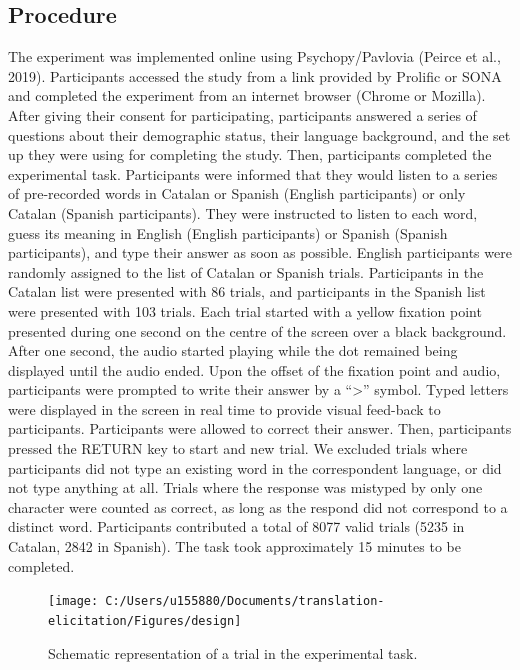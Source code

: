 \documentclass[
  english,
  man,floatsintext]{apa6}
\begin{document}
\hypertarget{procedure}{%
\subsection{Procedure}\label{procedure}}

The experiment was implemented online using Psychopy/Pavlovia (Peirce et al., 2019). Participants accessed the study from a link provided by Prolific or SONA and completed the experiment from an internet browser (Chrome or Mozilla). After giving their consent for participating, participants answered a series of questions about their demographic status, their language background, and the set up they were using for completing the study. Then, participants completed the experimental task. Participants were informed that they would listen to a series of pre-recorded words in Catalan or Spanish (English participants) or only Catalan (Spanish participants). They were instructed to listen to each word, guess its meaning in English (English participants) or Spanish (Spanish participants), and type their answer as soon as possible. English participants were randomly assigned to the list of Catalan or Spanish trials. Participants in the Catalan list were presented with 86 trials, and participants in the Spanish list were presented with 103 trials. Each trial started with a yellow fixation point presented during one second on the centre of the screen over a black background. After one second, the audio started playing while the dot remained being displayed until the audio ended. Upon the offset of the fixation point and audio, participants were prompted to write their answer by a ``\textgreater{}'' symbol. Typed letters were displayed in the screen in real time to provide visual feed-back to participants. Participants were allowed to correct their answer. Then, participants pressed the RETURN key to start and new trial. We excluded trials where participants did not type an existing word in the correspondent language, or did not type anything at all. Trials where the response was mistyped by only one character were counted as correct, as long as the respond did not correspond to a distinct word. Participants contributed a total of 8077 valid trials (5235 in Catalan, 2842 in Spanish). The task took approximately 15 minutes to be completed.

\begin{figure}
\texttt{[image: C:/Users/u155880/Documents/translation-elicitation/Figures/design]} \caption{Schematic representation of a trial in the experimental task.}\label{fig:procedurefigure}
\end{figure}
\end{document}

